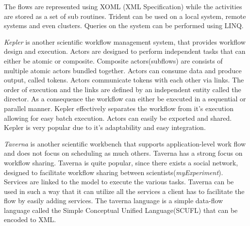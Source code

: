 \documentclass[11pt,twocolumn]{article}
\begin{document}
    The flows are represented using XOML (XML Specification) while
    the activities are stored as a set of sub routines. Trident
    can be used on a local system, remote systems and even clusters.
    Queries on the system can be performed using LINQ.
    \cite{Simmhan2011790}

    \emph{Kepler} is another scientific workflow
    management system, that provides workflow design and execution.
    Actors are designed to perform independent tasks that can either
    be atomic or  composite. Composite actors(subflows) are consists
    of multiple   atomic actors bundled together. Actors can consume data and
    produce output, called tokens. Actors communicate tokens with
    each other via links. The order of execution and the links are
    defined by an independent entity called the director. As a
    consequence the workflow can either be executed in a
    sequential or parallel manner. Kepler effectively separates
    the workflow from it's execution allowing for easy batch
    execution. Actors can easily be exported and shared.
    Kepler is very popular due to it's adaptability and easy
    integration. \cite{Wang:2009:KHG:1645164.1645176}

    \emph{Taverna} is another scientific workbench that supports
    application-level work flow and does not focus on scheduling
    as much others. Taverna has a strong focus on workflow
    sharing. Taverna is quite popular, since there exists
    a social network, designed to facilitate workflow sharing
    between scientists(\emph{myExperiment}). Services are linked to the model to
    execute the various tasks. Taverna can be used in such
    a way that it can utilize all the services a client has
    to facilitate the flow by easily adding services. The
    taverna language is a simple data-flow language called
    the Simple Conceptual Unified Language(SCUFL) that can
    be encoded to XML\cite{4721191}.
\end{document}

